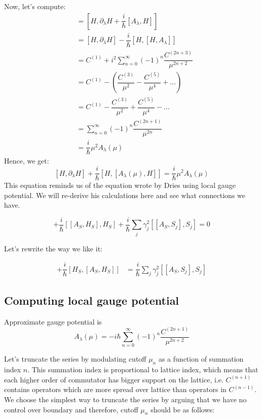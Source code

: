 \documentclass[11pt,a4paper]{article}
\begin{document}
Now, let's  compute:
\begin{align*}
[H, G_{\lambda}(\mu)]&=[H, \partial_{\lambda} H + \dfrac{i}{\hbar} [A_{\lambda}, H]] \\
&= [H, \partial_{\lambda} H] - \dfrac{i}{\hbar} [H,[ H, A_{\lambda}]]\\
&= C^{(1)} + i^2    \sum_{n=0}^{\infty}   (-1)^{n} \dfrac{ C^{(2n+3)}}{\mu^{2n+2}}\\
&= C^{(1)} -  (   \dfrac{ C^{(3)}}{\mu^{2}} - \dfrac{ C^{(5)}}{\mu^{4}} + \ldots)\\
&= C^{(1)} -   \dfrac{ C^{(3)}}{\mu^{2}} + \dfrac{ C^{(5)}}{\mu^{4}} - \ldots\\
&=\sum_{n=0}^{\infty}   (-1)^{n} \dfrac{ C^{(2n+1)}}{\mu^{2n}}\\
&= \dfrac{i}{\hbar} \mu^2 A_{\lambda} (\mu)
\end{align*}
Hence, we get:
 \begin{equation}
 \boxed{[H, \partial_{\lambda} H] + \dfrac{i}{\hbar}[H, [A_{\lambda}(\mu), H]]= \dfrac{i}{\hbar} \mu^2 A_{\lambda} (\mu)}
 \end{equation}
This equation reminds us of the equation wrote by Dries using local gauge potential. We will re-derive his calculations here and see what connections we have.

\begin{equation}
 [\partial_{\lambda} H_S, H_S ] + \dfrac{i}{\hbar}[ [A_{S}, H_S], H_S] + \dfrac{i}{\hbar} \sum_j \gamma_j^2 [[A_{S}, S_j], S_j ]=0
 \end{equation}

Let's rewrite the way we like it:

\begin{align*}
 [ H_S,\partial_{\lambda} H_S ] + \dfrac{i}{\hbar}[ H_S, [A_{S}, H_S]] &= \dfrac{i}{\hbar} \sum_j \gamma_j^2 [[A_{S}, S_j], S_j ]
 \end{align*}


\subsection{Computing local gauge potential }

Approximate gauge potential is 
\begin{equation}
 A_{\lambda}(\mu) =  -i\hbar \sum_{n=0}^{\infty}   (-1)^{n} \dfrac{ C^{(2n+1)}}{\mu^{2n+2}}
\end{equation}

Let's truncate the series by modulating cutoff $\mu_n$ as a function of summation index $n$. This summation index is proportional to lattice index, which means that each higher order of commutator  has bigger support on the lattice, i.e. $C^{(n+1)}$ contains operators which are more spread over lattice than operators in $C^{(n-1)}$. We choose the simplest way to truncate the series by arguing that we have no control over boundary and therefore, cutoff $\mu_n$ should be as follows:
\end{document}
